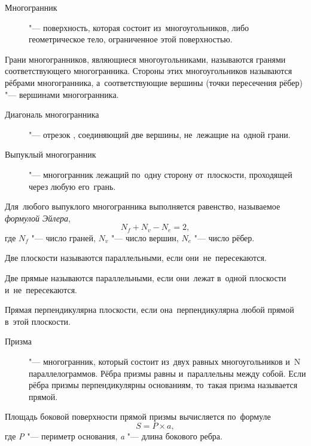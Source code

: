 \documentclass[]{scrartcl}
\begin{document}
\begin{description}
	\item[Многогранник] "--- поверхность, которая состоит из~многоугольников, либо геометрическое тело, ограниченное этой поверхностью. 
\end{description}
Грани многогранников, являющиеся многоугольниками, называются гранями соответствующего многогранника. Стороны этих многоугольников называются рёбрами многогранника, а~соответствующие вершины (точки пересечения рёбер) "--- вершинами многогранника.

\begin{description}
	\item[Диагональ многогранника] "--- отрезок , соединяющий две вершины, не~лежащие на~одной грани. 
\end{description}

\begin{description}
	\item[Выпуклый многогранник] "--- многогранник лежащий по~одну сторону от~плоскости, проходящей через любую его~грань. 
\end{description}
Для~любого выпуклого многогранника выполняется равенство, называемое \emph{формулой Эйлера},
\begin{equation}\label{eq:poluhedron-equality}
N_{f}+N_{v}-N_{e} = 2,
\end{equation}
где $N_{f}$ "--- число граней, $N_{v}$ "--- число вершин, $N_{e}$ "--- число рёбер.

\begin{proposition}
	Две плоскости называются параллельными, если они~не~пересекаются.
\end{proposition}

\begin{proposition}
	 Две прямые называются параллельными, если они~лежат в~одной плоскости и~не~пересекаются.
\end{proposition}

\begin{proposition}
	Прямая перпендикулярна плоскости, если она~перпендикулярна любой прямой в~этой плоскости.
\end{proposition}

\begin{description}
	\item[Призма] "--- многогранник, который состоит из~двух равных многоугольников и~N параллелограммов. Рёбра призмы равны и~параллельны между собой. Если рёбра призмы перпендикулярны основаниям, то~такая призма называется прямой.
\end{description}
Площадь боковой поверхности прямой призмы вычисляется по~формуле
\begin{equation}\label{eq:square-of-side-surface-of-the-prism}
S=P \times a,
\end{equation}
где \textit{P} "--- периметр основания, \textit{a} "--- длина бокового ребра.
\end{document}
